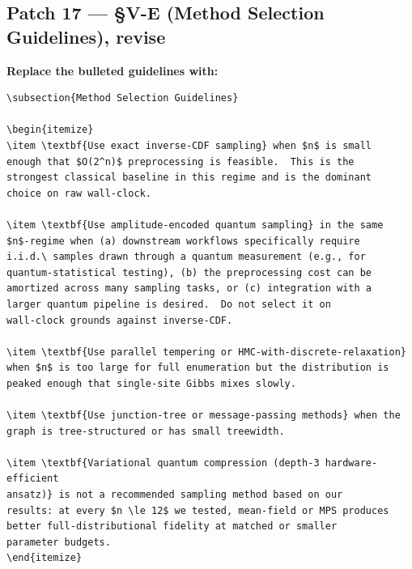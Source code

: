 \subsection*{Patch 17 --- \S V-E (Method Selection Guidelines), revise}

\textbf{Replace the bulleted guidelines with:}

\begin{verbatim}
\subsection{Method Selection Guidelines}

\begin{itemize}
\item \textbf{Use exact inverse-CDF sampling} when $n$ is small
enough that $O(2^n)$ preprocessing is feasible.  This is the
strongest classical baseline in this regime and is the dominant
choice on raw wall-clock.

\item \textbf{Use amplitude-encoded quantum sampling} in the same
$n$-regime when (a) downstream workflows specifically require
i.i.d.\ samples drawn through a quantum measurement (e.g., for
quantum-statistical testing), (b) the preprocessing cost can be
amortized across many sampling tasks, or (c) integration with a
larger quantum pipeline is desired.  Do not select it on
wall-clock grounds against inverse-CDF.

\item \textbf{Use parallel tempering or HMC-with-discrete-relaxation}
when $n$ is too large for full enumeration but the distribution is
peaked enough that single-site Gibbs mixes slowly.

\item \textbf{Use junction-tree or message-passing methods} when the
graph is tree-structured or has small treewidth.

\item \textbf{Variational quantum compression (depth-3 hardware-efficient
ansatz)} is not a recommended sampling method based on our
results: at every $n \le 12$ we tested, mean-field or MPS produces
better full-distributional fidelity at matched or smaller
parameter budgets.
\end{itemize}
\end{verbatim}

